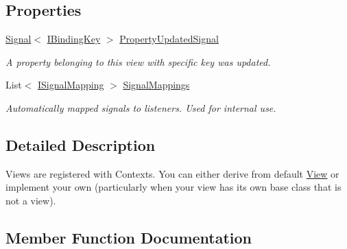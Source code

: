 \subsection*{Properties}
\begin{DoxyCompactItemize}
\item 
\mbox{\hyperlink{classcp_games_1_1core_1_1_rapid_m_v_c_1_1_signal}{Signal}}$<$ \mbox{\hyperlink{interfacecp_games_1_1core_1_1_rapid_m_v_c_1_1_i_binding_key}{I\+Binding\+Key}} $>$ \mbox{\hyperlink{interfacecp_games_1_1core_1_1_rapid_m_v_c_1_1_i_view_ae21e2d124f1e977c79babb40c3e991e8}{Property\+Updated\+Signal}}
\begin{DoxyCompactList}\small\item\em A property belonging to this view with specific key was updated. \end{DoxyCompactList}\item 
List$<$ \mbox{\hyperlink{interfacecp_games_1_1core_1_1_rapid_m_v_c_1_1impl_1_1_i_signal_mapping}{I\+Signal\+Mapping}} $>$ \mbox{\hyperlink{interfacecp_games_1_1core_1_1_rapid_m_v_c_1_1_i_view_a5bd50e4d816c545fd092c59ed14fcbf0}{Signal\+Mappings}}
\begin{DoxyCompactList}\small\item\em Automatically mapped signals to listeners. Used for internal use. \end{DoxyCompactList}\end{DoxyCompactItemize}


\subsection{Detailed Description}
Views are registered with Contexts. You can either derive from default \mbox{\hyperlink{classcp_games_1_1core_1_1_rapid_m_v_c_1_1_view}{View}} or implement your own (particularly when your view has its own base class that is not a view). 



\subsection{Member Function Documentation}
\mbox{\label{interfacecp_games_1_1core_1_1_rapid_m_v_c_1_1_i_view_a2d09577e2b5475273d73484a8d3ff36d}} 
